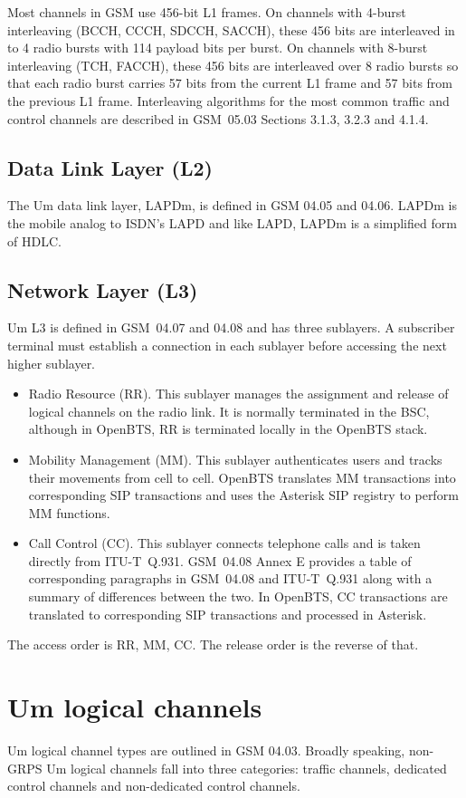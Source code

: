 \documentclass[11pt,openany]{book}
\begin{document}
Most channels in GSM use 456-bit L1 frames. On channels with 4-burst interleaving (BCCH, CCCH, SDCCH, SACCH), these 456 bits are interleaved in to 4 radio bursts with 114 payload bits per burst. On channels with 8-burst interleaving (TCH, FACCH), these 456 bits are interleaved over 8 radio bursts so that each radio burst carries 57 bits from the current L1 frame and 57 bits from the previous L1 frame. Interleaving algorithms for the most common traffic and control channels are described in GSM~05.03 Sections 3.1.3, 3.2.3 and 4.1.4.

\subsection{Data Link Layer (L2)}
The Um data link layer, LAPDm, is defined in GSM 04.05 and 04.06. LAPDm is the mobile analog to ISDN's LAPD and like LAPD, LAPDm is a simplified form of HDLC.

\subsection{Network Layer (L3)}
Um L3 is defined in GSM~04.07 and 04.08 and has three sublayers. A subscriber terminal must establish a connection in each sublayer before accessing the next higher sublayer.
\begin{itemize}
	\item Radio Resource (RR). This sublayer manages the assignment and release of logical channels on the radio link. It is normally terminated in the BSC, although in OpenBTS, RR is terminated locally in the OpenBTS stack.
	\item Mobility Management (MM). This sublayer authenticates users and tracks their movements from cell to cell. OpenBTS translates MM transactions into corresponding SIP transactions and uses the Asterisk SIP registry to perform MM functions.
	\item Call Control (CC). This sublayer connects telephone calls and is taken directly from ITU-T~Q.931. GSM~04.08 Annex E provides a table of corresponding paragraphs in GSM~04.08 and ITU-T~Q.931 along with a summary of differences between the two. In OpenBTS, CC transactions are translated to corresponding SIP transactions and processed in Asterisk.
\end{itemize}
The access order is RR, MM, CC. The release order is the reverse of that.

\section{Um logical channels}
Um logical channel types are outlined in GSM 04.03. Broadly speaking, non-GRPS Um logical channels fall into three categories: traffic channels, dedicated control channels and non-dedicated control channels.
\end{document}
